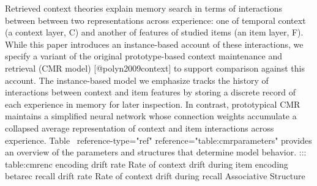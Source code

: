 Retrieved context theories explain memory search in terms of interactions between between two representations across experience: one of temporal context (a context layer, \markdownRendererDollarSign{}C\markdownRendererDollarSign{}) and another of features of studied items (an item layer, \markdownRendererDollarSign{}F\markdownRendererDollarSign{}). While this paper introduces an instance-based account of these interactions, we specify a variant of the original prototype-based context maintenance and retrieval (CMR model) [@polyn2009context] to support comparison against this account. The instance-based model we emphasize tracks the history of interactions between context and item features by storing a discrete record of each experience in memory for later inspection. In contrast, prototypical CMR maintains a simplified neural network whose connection weights accumulate a collapsed average representation of context and item interactions across experience. Table  \markdownRendererLeftBrace{}reference-type="ref" reference="table:cmr\markdownRendererUnderscore{}parameters"\markdownRendererRightBrace{} provides an overview of the parameters and structures that determine model behavior.\markdownRendererInterblockSeparator
{}::: \markdownRendererLeftBrace{}\markdownRendererHash{}table:cmr\markdownRendererLeftBrace{}enc\markdownRendererRightBrace{}\markdownRendererDollarSign{} encoding drift rate Rate of context drift during item encoding \markdownRendererDollarSign{}\markdownRendererLeftBrace{}\markdownRendererBackslash{}beta\markdownRendererRightBrace{}\markdownRendererLeftBrace{}rec\markdownRendererRightBrace{}\markdownRendererDollarSign{} recall drift rate Rate of context drift during recall Associative Structure\markdownRendererLineBreak
